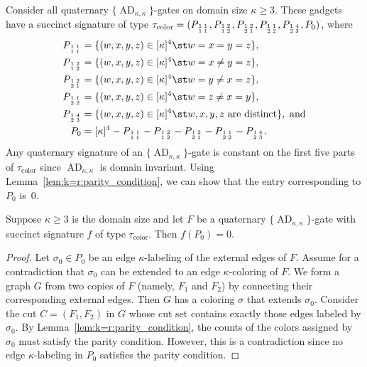 \documentclass[11pt]{article}
\newcommand{\AD}{\operatorname{AD}}
\newcommand{\subMat}[4]{\mbox{\scriptsize $\begin{smallmatrix} #1 & #4 \\ #2 & #3 \end{smallmatrix}$}}
\begin{document}
Consider all quaternary $\{\AD_{\kappa,\kappa}\}$-gates on domain size $\kappa \ge 3$.
These gadgets have a succinct signature of type $\tau_\text{color} =
(
 P_{\subMat{1}{1}{1}{1}},
 P_{\subMat{1}{1}{2}{2}},
 P_{\subMat{1}{2}{1}{2}},
 P_{\subMat{1}{2}{2}{1}},
 P_{\subMat{1}{2}{3}{4}},
 P_0
)$,
where
\begin{align*}
 P_{\subMat{1}{1}{1}{1}} &= \{(w,x,y,z) \in [\kappa]^4 \st w = x = y = z\},\\
 P_{\subMat{1}{1}{2}{2}} &= \{(w,x,y,z) \in [\kappa]^4 \st w = x \ne y = z\},\\
 P_{\subMat{1}{2}{1}{2}} &= \{(w,x,y,z) \in [\kappa]^4 \st w = y \ne x = z\},\\
 P_{\subMat{1}{2}{2}{1}} &= \{(w,x,y,z) \in [\kappa]^4 \st w = z \ne x = y\},\\
 P_{\subMat{1}{2}{3}{4}} &= \{(w,x,y,z) \in [\kappa]^4 \st w, x, y, z \text{ are distinct}\}, \text{ and}\\
 P_0 &= [\kappa]^4
 - P_{\subMat{1}{1}{1}{1}}
 - P_{\subMat{1}{1}{2}{2}}
 - P_{\subMat{1}{2}{1}{2}}
 - P_{\subMat{1}{2}{2}{1}}
 - P_{\subMat{1}{2}{3}{4}}.
\end{align*}
Any quaternary signature of an $\{\AD_{\kappa,\kappa}\}$-gate is constant on the first five parts of $\tau_\text{color}$ since $\AD_{\kappa,\kappa}$ is domain invariant.
Using Lemma~\ref{lem:k=r:parity_condition},
we can show that the entry corresponding to $P_0$ is~$0$.

\begin{lemma} \label{lem:coloring:k=r:f(P_0)=0}
 Suppose $\kappa \ge 3$ is the domain size
 and let $F$ be a quaternary $\{\AD_{\kappa,\kappa}\}$-gate with succinct signature $f$ of type $\tau_\text{color}$.
 Then $f(P_0) = 0$.
\end{lemma}

\begin{proof}
 Let $\sigma_0 \in  P_0$ be an edge $\kappa$-labeling of the external edges of $F$.
 Assume for a contradiction that $\sigma_0$ can be extended to an edge $\kappa$-coloring of $F$.
 We form a graph $G$ from two copies of $F$ (namely, $F_1$ and $F_2$) by connecting their corresponding external edges.
 Then $G$ has a coloring $\sigma$ that extends $\sigma_0$.
 Consider the cut $C = (F_1, F_2)$ in $G$ whose cut set contains exactly those edges labeled by $\sigma_0$.
 By Lemma~\ref{lem:k=r:parity_condition},
 the counts of the colors assigned by $\sigma_0$ must satisfy the parity condition.
 However, this is a contradiction since no edge $\kappa$-labeling in $P_0$ satisfies the parity condition.
\end{proof}
\end{document}
